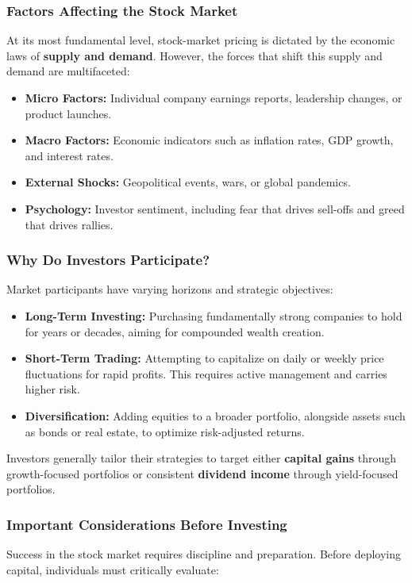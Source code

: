\documentclass[12pt,openany]{book}
\begin{document}
\subsubsection{Factors Affecting the Stock Market}
At its most fundamental level, stock-market pricing is dictated by the economic laws of \textbf{supply and demand}. However, the forces that shift this supply and demand are multifaceted:

\begin{itemize}[leftmargin=*]
    \item \textbf{Micro Factors:} Individual company earnings reports, leadership changes, or product launches.
    \item \textbf{Macro Factors:} Economic indicators such as inflation rates, GDP growth, and interest rates.
    \item \textbf{External Shocks:} Geopolitical events, wars, or global pandemics.
    \item \textbf{Psychology:} Investor sentiment, including fear that drives sell-offs and greed that drives rallies.
\end{itemize}

\subsubsection{Why Do Investors Participate?}
Market participants have varying horizons and strategic objectives:

\begin{itemize}[leftmargin=*]
    \item \textbf{Long-Term Investing:} Purchasing fundamentally strong companies to hold for years or decades, aiming for compounded wealth creation.
    \item \textbf{Short-Term Trading:} Attempting to capitalize on daily or weekly price fluctuations for rapid profits. This requires active management and carries higher risk.
    \item \textbf{Diversification:} Adding equities to a broader portfolio, alongside assets such as bonds or real estate, to optimize risk-adjusted returns.
\end{itemize}

Investors generally tailor their strategies to target either \textbf{capital gains} through growth-focused portfolios or consistent \textbf{dividend income} through yield-focused portfolios.

\subsubsection{Important Considerations Before Investing}
Success in the stock market requires discipline and preparation. Before deploying capital, individuals must critically evaluate:
\end{document}
